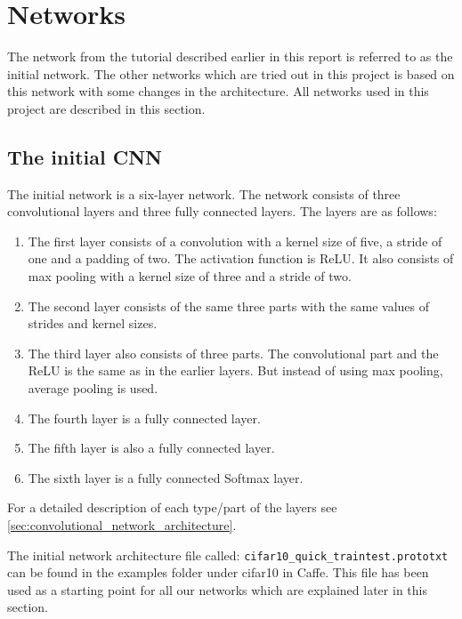 \graphicspath{{Chapters/Project/}}

\section{Networks} %
\label{sec:networks}

The network from the tutorial described earlier in this report is referred to
as the initial network. The other networks which are tried out in this
project is based on this network with some changes in the architecture. All
networks used in this project are described in this section.

\subsection{The initial CNN} %
\label{sub:the_initial_network}

The initial network is a six-layer network. The network consists of three
convolutional layers and three fully connected layers. The layers are as
follows:

\begin{enumerate}
	\item The first layer consists of a convolution with a kernel size of five, a
	stride of one and a padding of two. The activation function is ReLU. It
	also consists of max pooling with a kernel size of three and a stride of two.
	\item The second layer consists of the same three parts with the same values
	of strides and kernel sizes.
	\item The third layer also consists of three parts. The convolutional part
	and the ReLU is the same as in the earlier layers. But instead of using max
	pooling, average pooling is used.
	\item The fourth layer is a fully connected layer.
	\item The fifth layer is also a fully connected layer.
	\item The sixth layer is a fully connected Softmax layer.
\end{enumerate}
For a detailed description of each type/part of the layers see
\autoref{sec:convolutional_network_architecture}.

The initial network architecture file called:
\verb|cifar10_quick_traintest.prototxt| can be found in the examples folder
under cifar10 in Caffe\cite{caffe}. This file has been used as a starting point
for all our networks which are explained later in this section. 

